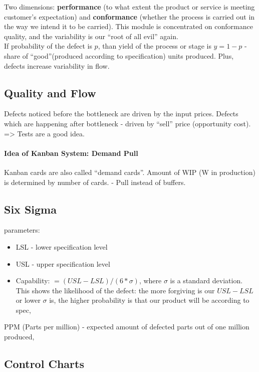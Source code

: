 \documentclass{scrartcl}
\begin{document}
Two dimensions: {\bf performance} (to what extent the product or service is meeting customer's expectation) and {\bf conformance} (whether the process is carried out in the way we intend it to be carried). This module is concentrated on conformance quality, and the variability is our ``root of all evil'' again.\\

If probability of the defect is $p$, than yield of the process or stage is $y = 1 - p$ - share of ``good''(produced according to specification) units produced. Plus, defects increase variability in flow.

\subsection{Quality and Flow}
\label{sec:07-02}
Defects noticed before the bottleneck are driven by the input prices. Defects which are happening after bottleneck - driven by ``sell'' price (opportunity cost). => Tests are a good idea.\\

\paragraph{Idea of Kanban System: Demand Pull}
Kanban cards are also called ``demand cards''. Amount of WIP (W in production) is determined by number of cards. - Pull instead of buffers.

\subsection{Six Sigma}
\label{sec:07-03}

parameters:
\begin{itemize}
\item LSL - lower specification level
\item USL - upper specification level

\item Capability: $= (USL-LSL) / (6 * \sigma)$, where $\sigma$ is a standard deviation. This shows the likelihood of the defect: the more forgiving is our $USL - LSL$ or lower $\sigma$ is, the higher probability is that our product will be according to spec,
\end{itemize}

PPM (Parts per million) - expected amount of defected parts out of one million produced,

\subsection{Control Charts}
\label{sec:07-04}
\end{document}
